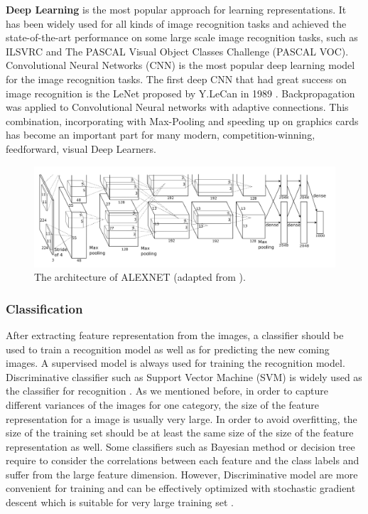 \textbf{Deep Learning} is the most popular approach for learning representations. It has been widely used for all kinds of image recognition tasks and achieved the state-of-the-art performance on some large scale image recognition tasks, such as ILSVRC and The PASCAL Visual Object Classes Challenge (PASCAL VOC). 
Convolutional Neural Networks (CNN) is the most popular deep learning model for the image recognition tasks. The first deep CNN that had great success on image recognition is the LeNet proposed by Y.LeCan in 1989 \cite{lecun1989backpropagation}. Backpropagation was applied to Convolutional Neural networks with adaptive connections. This combination, incorporating with Max-Pooling and speeding up on graphics cards has become an important part for  many modern, competition-winning, feedforward, visual Deep Learners. 
\begin{figure}
	\centering
	\includegraphics[scale=.3]{introduction/fig/alexnet.png}
	\caption{The architecture of ALEXNET (adapted from \cite{krizhevsky2012imagenet}).}\label{fig:intro:alex}
\end{figure}



\subsubsection{Classification}
After extracting feature representation from the images, a classifier should be used to train a recognition model as well as for predicting the new coming images. A supervised model is always used for training the recognition model. Discriminative classifier such as Support Vector Machine (SVM) is widely used as the classifier for recognition \cite{cristianini2000introduction}. As we mentioned before, in order to capture different variances of the images for one category, the size of the feature representation for a image is usually very large. In order to avoid overfitting, the size of the training set should be at least the same size of the size of the feature representation as well. Some classifiers such as Bayesian method or decision tree require to consider the correlations between each feature and the class labels and suffer from the large feature dimension. However, Discriminative model are more convenient for training and can be effectively optimized with stochastic gradient descent which is suitable for very large training set \cite{bottou2010large}.





